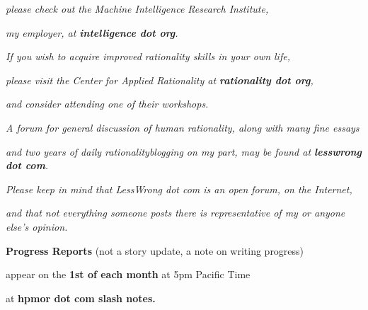 \emph{please check out the Machine Intelligence Research Institute,}

\emph{my employer, at \textbf{intelligence dot org}.}

\emph{If you wish to acquire improved rationality skills in your own
life,}

\emph{please visit the Center for Applied Rationality at
\textbf{rationality dot org},}

\emph{and consider attending one of their workshops.}

\emph{A forum for general discussion of human rationality, along with
many fine essays}

\emph{and two years of daily rationalityblogging on my part, may be
found at \textbf{lesswrong dot com}.}

\emph{Please keep in mind that LessWrong dot com is an open forum, on
the Internet,}

\emph{and that not everything someone posts there is representative of
my or anyone else's opinion.}

\textbf{Progress Reports} (not a story update, a note on writing
progress)

appear on the \textbf{1st of each month} at 5pm Pacific Time

at \textbf{hpmor dot com slash notes.}
